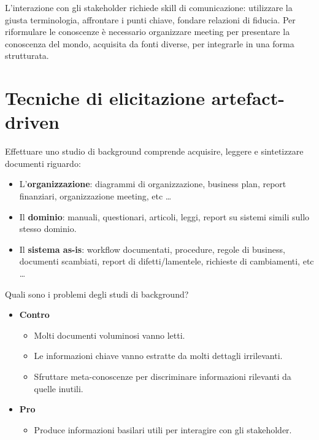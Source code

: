 \documentclass[../main.tex]{subfiles}
\begin{document}
L'interazione con gli stakeholder richiede skill di comunicazione: utilizzare la giusta terminologia, affrontare i punti chiave, fondare relazioni di fiducia.
Per riformulare le conoscenze è necessario organizzare meeting per presentare la conoscenza del mondo, acquisita da fonti diverse, per integrarle in una forma strutturata.
\section{Tecniche di elicitazione artefact-driven}
Effettuare uno studio di background comprende acquisire, leggere e sintetizzare documenti riguardo:
\begin{itemize}
	\item L'\textbf{organizzazione}: diagrammi di organizzazione, business plan, report finanziari, organizzazione meeting, etc \dots
	\item Il \textbf{dominio}: manuali, questionari, articoli, leggi, report su sistemi simili sullo stesso dominio.
	\item Il \textbf{sistema as-is}: workflow documentati, procedure, regole di business, documenti scambiati, report di difetti/lamentele, richieste di cambiamenti, etc \dots
\end{itemize}
Quali sono i problemi degli studi di background?
\begin{itemize}
	\item \textbf{Contro}
	\begin{itemize}
		\item Molti documenti voluminosi vanno letti.
		\item Le informazioni chiave vanno estratte da molti dettagli irrilevanti.
		\item Sfruttare meta-conoscenze per discriminare informazioni rilevanti da quelle inutili.
	\end{itemize}
	\item \textbf{Pro}
	\begin{itemize}
		\item Produce informazioni basilari utili per interagire con gli stakeholder.
	\end{itemize}
\end{itemize}
\end{document}
